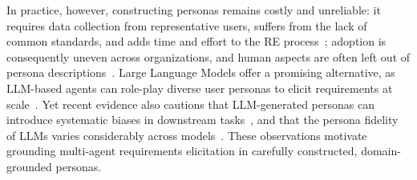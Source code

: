 In practice, however, constructing personas remains costly and unreliable: it requires data collection from representative users, suffers from the lack of common standards, and adds time and effort to the RE process~\cite{karolita2023personas}; adoption is consequently uneven across organizations, and human aspects are often left out of persona descriptions~\cite{wang2025personas}. Large Language Models offer a promising alternative, as LLM-based agents can role-play diverse user personas to elicit requirements at scale~\cite{ataei2025elicitron}. Yet recent evidence also cautions that LLM-generated personas can introduce systematic biases in downstream tasks~\cite{li2026persona}, and that the persona fidelity of LLMs varies considerably across models~\cite{samuel2025personagym}. These observations motivate grounding multi-agent requirements elicitation in carefully constructed, domain-grounded personas.
